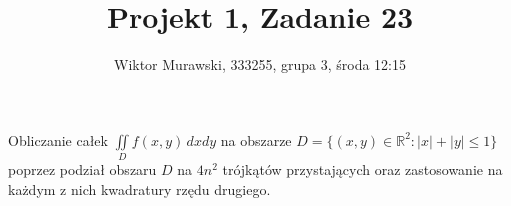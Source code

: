 \documentclass[9pt]{beamer}
\title{Projekt 1, Zadanie 23}
\author{Wiktor Murawski, 333255, grupa 3, środa 12:15}
\date{}
\begin{document}
\begin{frame}

    \begin{spacing}{1.75}
    \begin{center}
        \inserttitle\par
        \insertauthor
    \end{center}
    \vspace{2em}
    Obliczanie całek $ \iint\limits_D f(x,y) \, dxdy $ na obszarze
    $  D = \{(x,y) \in \mathbb{R}^2 : |x| + |y| \leq 1\} $
    poprzez podział obszaru $ D $ na $ 4n^2 $ trójkątów przystających oraz
    zastosowanie na każdym z nich kwadratury rzędu drugiego.
    \end{spacing}
\end{frame}
\end{document}
